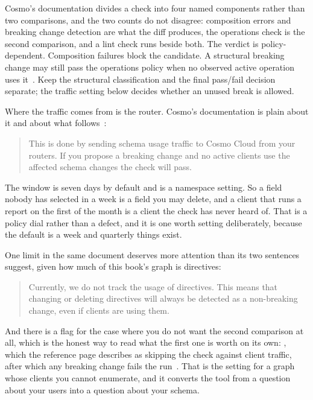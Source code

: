 %
Cosmo's documentation divides a check into four named components rather than
two comparisons, and the two counts do not disagree: composition errors and
breaking change detection are what the diff produces, the operations check is
the second comparison, and a lint check runs beside both. The verdict is
policy-dependent. Composition failures block the candidate. A structural
breaking change may still pass the operations policy when no observed active
operation uses it~\autocite{cosmochecks}. Keep the structural classification
and the final pass/fail decision separate; the traffic setting below decides
whether an unused break is allowed.

%
Where the traffic comes from is the router. Cosmo's documentation is plain
about it and about what follows~\autocite{cosmochecks}:

\begin{quote}
This is done by sending schema usage traffic to Cosmo Cloud from your routers.
If you propose a breaking change and no active clients use the affected schema
changes the check will pass.
\end{quote}

%
The window is seven days by default and is a namespace setting. So a field
nobody has selected in a week is a field you may delete, and a client that
runs a report on the first of the month is a client the check has never heard
of. That is a policy dial rather than a defect, and it is one worth setting
deliberately, because the default is a week and quarterly things exist.

%
One limit in the same document deserves more attention than its two sentences
suggest, given how much of this book's graph is directives:

\begin{quote}
Currently, we do not track the usage of directives. This means that changing or
deleting directives will always be detected as a non-breaking change, even if
clients are using them.
\end{quote}

%
And there is a flag for the case where you do not want the second comparison
at all, which is the honest way to read what the first one is worth on its
own: , which the reference page describes as
skipping the check against client traffic, after which any breaking change
fails the run~\autocite{cosmoclicheck}. That is
the setting for a graph whose clients you cannot enumerate, and it converts
the tool from a question about your users into a question about your schema.

